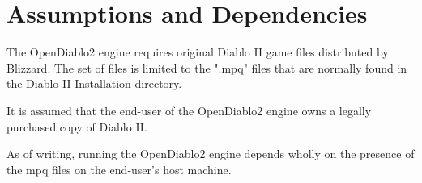 \section{Assumptions and Dependencies} \label{sec:assumptions_dependencies}


The OpenDiablo2 engine requires original Diablo II game files distributed by Blizzard.
The set of files is limited to the ".mpq" files that are normally found in the Diablo II Installation directory.

It is assumed that the end-user of the OpenDiablo2 engine owns a legally purchased copy of Diablo II.

As of writing, running the OpenDiablo2 engine depends wholly on the presence of the mpq files on the end-user's host machine.

